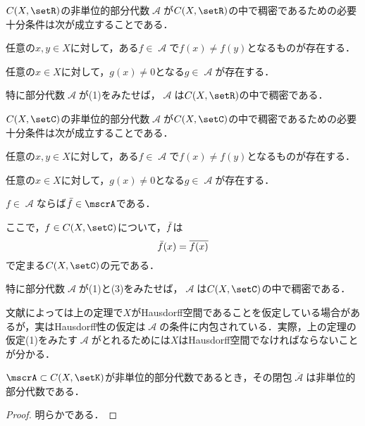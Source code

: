 \documentclass[uplatex]{jsarticle}
\begin{document}
\begin{theorem}\label{SWR}
$C(X,\setR)$の非単位的部分代数$\mscrA$が$C(X,\setR)$の中で稠密であるための必要十分条件は次が成立することである．
\begin{enumarabicp}
\item 任意の$x,y\in X$に対して，ある$f\in \mscrA$で$f(x)\neq f(y)$となるものが存在する．
\item 任意の$x\in X$に対して，$g(x)\neq 0$となる$g\in \mscrA$が存在する．
\end{enumarabicp}
特に部分代数$\mscrA$が(1)をみたせば，$\mscrA$は$C(X,\setR)$の中で稠密である．
\end{theorem}

\begin{theorem}\label{SWC}
$C(X,\setC)$の非単位的部分代数$\mscrA$が$C(X,\setC)$の中で稠密であるための必要十分条件は次が成立することである．
\begin{enumarabicp}
\item 任意の$x,y\in X$に対して，ある$f\in \mscrA$で$f(x)\neq f(y)$となるものが存在する．
\item 任意の$x\in X$に対して，$g(x)\neq 0$となる$g\in \mscrA$が存在する．
\item $f\in \mscrA$ならば$\Bar{f}\in \mscrA$である．
\end{enumarabicp}
ここで，$f\in C(X,\setC)$について，$\Bar{f}$は
\[ \Bar{f}(x) = \overline{f(x)} \]
で定まる$C(X,\setC)$の元である．

特に部分代数$\mscrA$が(1)と(3)をみたせば，$\mscrA$は$C(X,\setC)$の中で稠密である．
\end{theorem}

\begin{remark}
文献によっては上の定理で$X$がHausdorff空間であることを仮定している場合があるが，実はHausdorff性の仮定は$\mscrA$の条件に内包されている．実際，上の定理の仮定(1)をみたす$\mscrA$がとれるためには$X$はHausdorff空間でなければならないことが分かる．
\end{remark}

\begin{lemma}
$\mscrA\subset C(X,\setK)$が非単位的部分代数であるとき，その閉包$\overline{\mscrA}$は非単位的部分代数である．
\end{lemma}
\begin{proof}
明らかである．
\end{proof}
\end{document}

